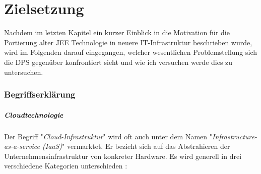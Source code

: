 \chapter{Zielsetzung \checkmark}

Nachdem im letzten Kapitel ein kurzer Einblick in die Motivation für die Portierung alter JEE Technologie in neuere IT-Infrastruktur beschrieben wurde, wird im Folgenden darauf eingegangen, welcher wesentlichen Problemstellung sich die DPS gegenüber konfrontiert sieht und wie ich versuchen werde dies zu untersuchen.


\subsection{Begriffserklärung \checkmark}

\paragraph{Cloudtechnologie}
Der Begriff "\emph{Cloud-Infrastruktur}" wird oft auch unter dem Namen "\emph{Infrastructure-as-a-service (IaaS)}" vermarktet. Er bezieht sich auf das Abstrahieren der Unternehmensinfrastruktur von konkreter Hardware. Es wird generell in drei verschiedene Kategorien unterschieden \cite[Seite~54]{continuous-delivery}:

